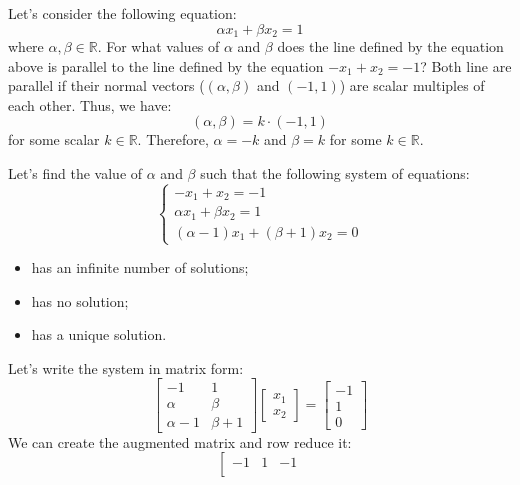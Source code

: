 \begin{exercise}
    Let's consider the following equation:
    \[
        \alpha x_1 + \beta x_2 = 1
    \]
    where $\alpha, \beta \in \mathbb{R}$. For what values of $\alpha$ and $\beta$ does the line defined by the equation above is parallel to the line defined by the equation $-x_1 + x_2 = -1$?
    \Answer
    Both line are parallel if their normal vectors ($(\alpha, \beta)$ and $(-1, 1)$) are scalar multiples of each other. Thus, we have:
    \[
        (\alpha, \beta) = k \cdot (-1, 1)
    \]
    for some scalar $k \in \mathbb{R}$. Therefore, $\alpha = -k$ and $\beta = k$ for some $k \in \mathbb{R}$.
\end{exercise}

\begin{exercise}
    Let's find the value of $\alpha$ and $\beta$ such that the following system of equations:
    \[
        \begin{cases}
            -x_1 + x_2 =  -1 \\
            \alpha x_1 + \beta x_2 = 1 \\
            (\alpha -1)x_1 + (\beta + 1)x_2 = 0
        \end{cases}
    \]
    \begin{itemize}[itemsep=1pt,label=$\circ$]
        \item has an infinite number of solutions;
        \item has no solution;
        \item has a unique solution.
    \end{itemize}
    \Answer
    Let's write the system in matrix form:
    \[
        \begin{bmatrix}
            -1 & 1 \\
            \alpha & \beta \\
            \alpha - 1 & \beta + 1
        \end{bmatrix}
        \begin{bmatrix} x_1 \\ x_2 \end{bmatrix}
        =
        \begin{bmatrix} -1 \\ 1 \\ 0 \end{bmatrix}
    \]
    We can create the augmented matrix and row reduce it:
    \[
        \left[\begin{array}{cc|c}
            -1 & 1 & -1 \\

\end{array}\]
\end{exercise}
